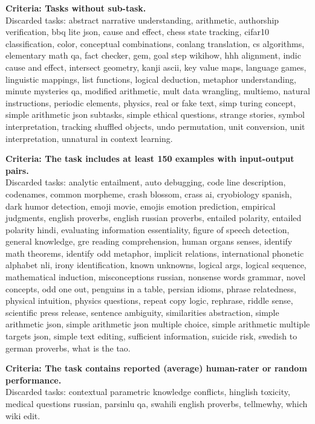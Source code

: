 \textbf{Criteria: Tasks without sub-task.}\\
Discarded tasks: abstract narrative understanding, arithmetic, authorship verification, bbq lite json, cause and effect, chess state tracking, cifar10 classification, color, conceptual combinations, conlang translation, cs algorithms, elementary math qa, fact checker, gem, goal step wikihow, hhh alignment, indic cause and effect, intersect geometry, kanji ascii, key value maps, language games, linguistic mappings, list functions, logical deduction, metaphor understanding, minute mysteries qa, modified arithmetic, mult data wrangling, multiemo, natural instructions, periodic elements, physics, real or fake text, simp turing concept, simple arithmetic json subtasks, simple ethical questions, strange stories, symbol interpretation, tracking shuffled objects, undo permutation, unit conversion, unit interpretation, unnatural in context learning.

\textbf{Criteria: The task includes at least 150 examples with input-output pairs.}\\
Discarded tasks: analytic entailment, auto debugging, code line description, codenames, common morpheme, crash blossom, crass ai, cryobiology spanish, dark humor detection, emoji movie, emojis emotion prediction, empirical judgments, english proverbs, english russian proverbs, entailed polarity, entailed polarity hindi, evaluating information essentiality, figure of speech detection, general knowledge, gre reading comprehension, human organs senses, identify math theorems, identify odd metaphor, implicit relations, international phonetic alphabet nli, irony identification, known unknowns, logical args, logical sequence, mathematical induction, misconceptions russian, nonsense words grammar, novel concepts, odd one out, penguins in a table, persian idioms, phrase relatedness, physical intuition, physics questions, repeat copy logic, rephrase, riddle sense, scientific press release, sentence ambiguity, similarities abstraction, simple arithmetic json, simple arithmetic json multiple choice, simple arithmetic multiple targets json, simple text editing, sufficient information, suicide risk, swedish to german proverbs, what is the tao.

\textbf{Criteria: The task contains reported (average) human-rater or random performance.}\\
Discarded tasks: contextual parametric knowledge conflicts, hinglish toxicity, medical questions russian, parsinlu qa, swahili english proverbs, tellmewhy, which wiki edit.

